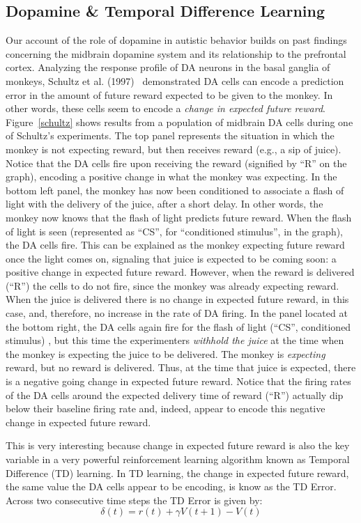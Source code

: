 \documentclass[man]{apa}
\begin{document}
\subsection{Dopamine \& Temporal Difference Learning}
Our account of the role of dopamine in autistic behavior builds on past findings concerning the midbrain dopamine system and its relationship to the prefrontal cortex. Analyzing the response profile of DA neurons in the basal ganglia of monkeys, Schultz et al. (1997)~\nocite{schultz97td} demonstrated DA cells can encode a prediction error in the amount of future reward expected to be given to the monkey.  In other words, these cells seem to encode a \emph{change in expected future reward}.  Figure~\ref{schultz} shows results from a population of midbrain DA cells during one of Schultz's experiments.  The top panel represents the situation in which the monkey is not expecting reward, but then receives reward (e.g., a sip of juice).  Notice that the DA cells fire upon receiving the reward (signified by ``R'' on the graph), encoding a positive change in what the monkey was expecting.  In the bottom left panel, the monkey has now been conditioned to associate a flash of light with the delivery of the juice, after a short delay.  In other words, the monkey now knows that the flash of light predicts future reward.  When the flash of light is seen (represented as ``CS'', for ``conditioned stimulus'', in the graph), the DA cells fire.  This can be explained as the monkey expecting future reward once the light comes on, signaling that juice is expected to be coming soon: a positive change in expected future reward.  However, when the reward is delivered (``R'') the cells to do not fire, since the monkey was already expecting reward.  When the juice is delivered there is no change in expected future reward, in this case, and, therefore, no increase in the rate of DA firing.  In the panel located at the bottom right, the DA cells again fire for the flash of light (``CS'', conditioned stimulus) , but this time the experimenters \emph{withhold the juice} at the time when the monkey is expecting the juice to be delivered.  The monkey is \emph{expecting} reward, but no reward is delivered. Thus, at the time that juice is expected, there is a negative going change in expected future reward.  Notice that the firing rates of the DA cells around the expected delivery time of reward (``R'') actually dip below their baseline firing rate and, indeed, appear to encode this negative change in expected future reward.

This is very interesting because change in expected future reward is also the key variable in a very powerful reinforcement learning algorithm known as Temporal Difference (TD) learning.  In TD learning, the change in expected future reward, the same value the DA cells appear to be encoding, is know as the TD Error.  Across two consecutive time steps the TD Error is given by: 
\begin{equation}\delta(t) = r(t) + \gamma V(t+1) - V(t)\end{equation}
\end{document}
